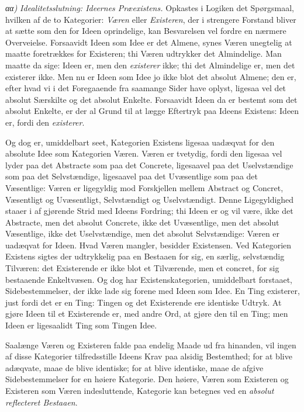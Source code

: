 \documentclass[12pt]{book}
\newcommand{\opage}[1]{\marginnote{\footnotesize\textit{[#1]}}}
\begin{document}
\textit{αα)} \emph{Idealitetsslutning: Ideernes Præexistens.} Opkastes i Logiken det Spørgsmaal, hvilken af de to Kategorier: \emph{Væren} eller \emph{Existeren}, der i strengere Forstand bliver at sætte som den for Ideen oprindelige, kan Besvarelsen vel fordre en nærmere Overveielse. Forsaavidt Ideen som Idee er det Almene, synes Væren unegtelig at maatte foretrækkes for Existeren; thi Væren udtrykker det Almindelige. Man maatte da sige: Ideen er, men den \emph{existerer} ikke; thi det Almindelige er, men det existerer ikke. Men nu er Ideen som Idee jo ikke blot det absolut Almene; den er, efter hvad vi i det Foregaaende fra saamange Sider have oplyst, ligesaa vel det absolut Særskilte og det absolut Enkelte. Forsaavidt Ideen da er bestemt som det absolut Enkelte, er der al Grund til at lægge Eftertryk paa Ideens Existens: Ideen er, fordi den \emph{existerer}.

Og dog er, umiddelbart seet, Kategorien Existens ligesaa uadæqvat for den absolute Idee som Kategorien Væren. Væren er tvetydig, fordi den ligesaa vel lyder paa det Abstracte som paa det Concrete, ligesaavel paa det Uselvstændige som paa det Selvstændige, ligesaavel paa det Uvæsentlige som paa det Væsentlige: Væren er ligegyldig mod Forskjellen mellem Abstract og Concret, Væsentligt og Uvæsentligt, Selvstændigt og Uselvstændigt. Denne Ligegyldighed staaer i af%
\opage{436}gjørende Strid med Ideens Fordring; thi Ideen er og vil være, ikke det Abstracte, men det absolut Concrete, ikke det Uvæsentlige, men det absolut Væsentlige, ikke det Uselvstændige, men det absolut Selvstændige: Væren er uadæqvat for Ideen. Hvad Væren mangler, besidder Existensen. Ved Kategorien Existens sigtes der udtrykkelig paa en Bestaaen for sig, en særlig, selvstændig Tilværen: det Existerende er ikke blot et Tilværende, men et concret, for sig bestaaende Enkeltvæsen. Og dog har Existenskategorien, umiddelbart forstaaet, Sidebestemmelser, der ikke lade sig forene med Ideen som Idee. En Ting existerer, just fordi det er en Ting: Tingen og det Existerende ere identiske Udtryk. At gjøre Ideen til et Existerende er, med andre Ord, at gjøre den til en Ting; men Ideen er ligesaalidt Ting som Tingen Idee.

Saalænge Væren og Existeren falde paa endelig Maade ud fra hinanden, vil ingen af disse Kategorier tilfredsstille Ideens Krav paa alsidig Bestemthed; for at blive adæqvate, maae de blive identiske; for at blive identiske, maae de afgive Sidebestemmelser for en høiere Kategorie. Den høiere, Væren som Existeren og Existeren som Væren indesluttende, Kategorie kan betegnes ved en \emph{absolut reflecteret Bestaaen}.
\end{document}
